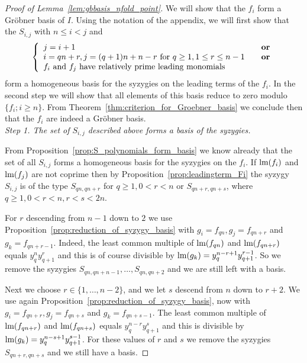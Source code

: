 \begin{proof}[Proof of Lemma~\ref{lem:gbbasis_nfold_point}]
  We will show that the $f_i$ form a Gr\"obner basis of $I$. Using the notation of the appendix, we will first show that the $S_{i,j}$ with $n\leq i      <j$ and
  \[ \left\{ \begin{array}{lcc} j=i+1 & & \text{\textbf{or}} \\ 
  i = qn + r, j=(q+1)n + n - r \text{ for } q\geq 1, 1\leq r \leq n-1 & & \text{\textbf{or}} \\ 
  f_i\text{ and } f_j \text{ have relatively prime leading monomials } & &  \end{array} \right.  \]
  form a homogeneous basis for the syzygies on the leading terms of the $f_i$. In the second step we will show that all elements of this basis reduce to zero modulo $\{f_i; i\geq n\}$. From Theorem~\ref{thm:criterion_for_Groebner_basis} we conclude then that the $f_i$ are indeed a Gr\"obner basis.\\
  
  \textit{Step 1. The set of $S_{i,j}$ described above forms a basis of the syzygies.} 
  
  From Proposition~\ref{prop:S_polynomials_form_basis} we know already that the set of all $S_{i,j}$ forms a homogeneous basis for the syzygies on the $f_i$. If $\textnormal{lm}(f_i)$ and $\textnormal{lm}(f_j)$ are not coprime then by Proposition~\ref{prop:leadingterm_Fi} the syzygy $S_{i,j}$ is of the type $S_{qn,qn+r}$ for $q\geq 1, 0< r< n$ or $S_{qn+r,qn+s}$, where $q\geq 1, 0< r <n, r<s<2n$. 
  
  For $r$ descending from $n-1$ down to $2$ we use Proposition~\ref{prop:reduction_of_syzygy_basis} with $g_i=f_{qn}, g_j = f_{qn+r}$ and $g_k = f_{qn+r-1}$. Indeed, the least common multiple of $\textnormal{lm}(f_{qn})$ and $\textnormal{lm}(f_{qn+r})$ equals $y_q^ny_{q+1}^r$ and this is of course divisible by $\textnormal{lm}(g_k)=y_q^{n-r+1 }y_{q+1}^{r-1}$. So we remove the syzygies $S_{qn,qn+n-1},\ldots , S_{qn,qn+2}$ and we are still left with a basis.
  
  Next we choose $r\in \{1,\ldots, n-2\}$, and we let $s$ descend from $n$ down to $r+2$. We use again Proposition~\ref{prop:reduction_of_syzygy_basis}, now with $g_i=f_{qn+r}, g_j = f_{qn+s}$ and $g_k = f_{qn+s-1}$. The least common multiple of $\textnormal{lm}(f_{qn+r})$ and $\textnormal{lm}(f_{qn+s})$ equals $y_q^{n-r} y_{q+1}^s$ and this is divisible by $\textnormal{lm}(g_k)=y_q^{n-s+1} y_{q+1}^{s-1}$. For these values of $r$ and $s$ we remove the syzygies $S_{qn+r,qn+s}$ and we still have a basis.
  

\end{proof}
